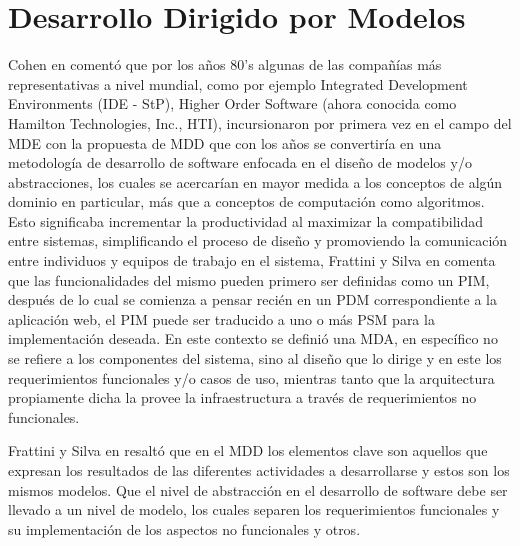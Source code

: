 \documentclass[oneside,12pt,a4paper]{memoir}%
\begin{document}
	\section{Desarrollo Dirigido por Modelos}
	\label{sec:MDD}
	Cohen en \cite{Cohen2008} coment\'o que por los a\~nos $80$'s algunas de las
	compa\~n\'ias m\'as representativas a nivel mundial, como por ejemplo
	Integrated Development Environments (IDE - StP), Higher Order Software (ahora
	conocida como Hamilton Technologies, Inc., HTI), incursionaron por primera vez
	en el campo del \ac{MDE} con la propuesta de \ac{MDD} que con los a\~nos se
	convertir\'ia en una metodolog\'ia de desarrollo de software enfocada en el
	dise\~no de modelos y/o abstracciones, los cuales se acercar\'ian en mayor
	medida a los conceptos de alg\'un dominio en particular, m\'as que a conceptos de
	computaci\'on como algoritmos. Esto significaba incrementar la productividad al maximizar la
	compatibilidad entre sistemas, simplificando el proceso de dise\~no y
	promoviendo la comunicaci\'on entre individuos y equipos de trabajo en el
	sistema, Frattini y Silva en \cite{Frattini2007} comenta que las
	funcionalidades del mismo pueden primero ser definidas como un \ac{PIM}, despu\'es de lo cual se comienza
	a pensar reci\'en en un \ac{PDM} correspondiente a la aplicaci\'on web, el
	\ac{PIM} puede ser traducido a uno o m\'as \ac{PSM} para la implementaci\'on deseada. En
	este contexto se defini\'o una \ac{MDA}, en espec\'ifico no se refiere a los
	componentes del sistema, sino al dise\~no que lo dirige y en este los
	requerimientos funcionales y/o casos de uso, mientras tanto que la arquitectura
	propiamente dicha la provee la infraestructura a trav\'es de requerimientos no
	funcionales.
	
	Frattini y Silva en \cite{Frattini2007} resalt\'o que en el \ac{MDD} los
	elementos clave son aquellos que expresan los resultados de las diferentes actividades a
	desarrollarse y estos son los mismos modelos.
	Que el nivel de abstracci\'on en el desarrollo de software debe ser llevado a
	un nivel de modelo, los cuales separen los requerimientos funcionales y su
	implementaci\'on de los aspectos no funcionales y otros.
	
\end{document}
